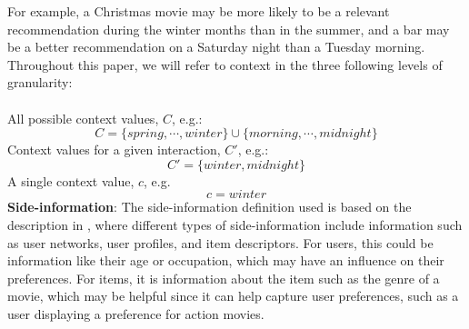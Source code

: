 For example, a Christmas movie may be more likely to be a relevant recommendation during the winter months than in the summer, and a bar may be a better recommendation on a Saturday night than a Tuesday morning.\\
Throughout this paper, we will refer to context in the three following levels of granularity:\\\\
All possible context values, $C$, e.g.:
$$C = \{spring, \cdots, winter\} \cup \{morning, \cdots, midnight\}$$
Context values for a given interaction, $C'$, e.g.:
$$C' = \{winter, midnight\}$$
A single context value, $c$, e.g. 
$$c = winter$$
\textbf{Side-information}:
The side-information definition used is based on the description in \cite{SideInfoDefinition}, where different types of side-information include information such as user networks, user profiles, and item descriptors.
For users, this could be information like their age or occupation, which may have an influence on their preferences.
For items, it is information about the item such as the genre of a movie, which may be helpful since it can help capture user preferences, such as a user displaying a preference for action movies.

